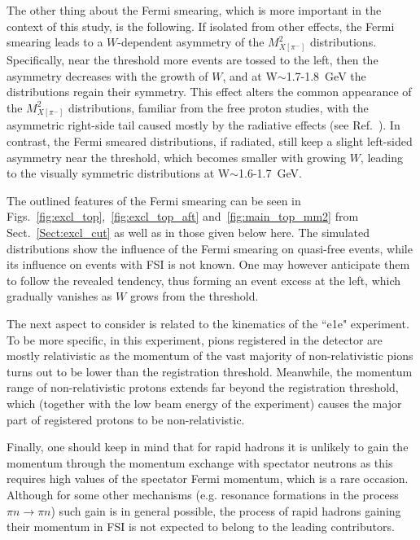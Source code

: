 The other thing about the Fermi smearing, which is more important in the context of this study, is the following. If isolated from other effects, the Fermi smearing leads to a $W$-dependent asymmetry of the $M^{2}_{X[\pi^{-}]}$ distributions. Specifically, near the threshold more events are tossed to the left, then the asymmetry decreases with the growth of $W$, and at W$\sim$1.7-1.8~GeV the distributions regain their symmetry. This effect alters the common appearance of the $M^{2}_{X[\pi^{-}]}$ distributions, familiar from the free proton studies, with the asymmetric right-side tail caused mostly by the radiative effects (see Ref.~\cite{Fed_an_note:2017,Fed_paper_2018}). In contrast, the Fermi smeared distributions, if radiated, still keep a slight left-sided asymmetry near the threshold, which becomes smaller with growing $W$, leading to the visually symmetric distributions at W$\sim$1.6-1.7~GeV.

The outlined features of the Fermi smearing can be seen in Figs.~\ref{fig:excl_top},~\ref{fig:excl_top_aft} and~\ref{fig:main_top_mm2} from Sect.~\ref{Sect:excl_cut} as well as in those given below here. The simulated distributions show the influence of the Fermi smearing on quasi-free events, while its influence on events with FSI is not known. One may however anticipate them to follow the revealed tendency, thus forming an event excess at the left, which gradually vanishes as $W$ grows from the threshold.

The next aspect to consider is related to the kinematics of the ``e1e" experiment. To be more specific, in this experiment, pions registered in the detector are mostly relativistic as the momentum of the vast majority of non-relativistic pions turns out to be lower than the registration threshold. Meanwhile, the momentum range of non-relativistic protons extends far beyond the registration threshold, which (together with the low beam energy of the experiment) causes the major part of registered protons to be non-relativistic.


Finally, one should keep in mind that for rapid hadrons it is unlikely to gain the momentum through the momentum exchange with spectator neutrons as this requires high values of the spectator Fermi momentum, which is a rare occasion. Although for some other mechanisms (e.g. resonance formations in the process $\pi n \rightarrow \pi n$) such gain is in general possible, the process of rapid hadrons gaining their momentum in FSI is not expected to belong to the leading contributors.



